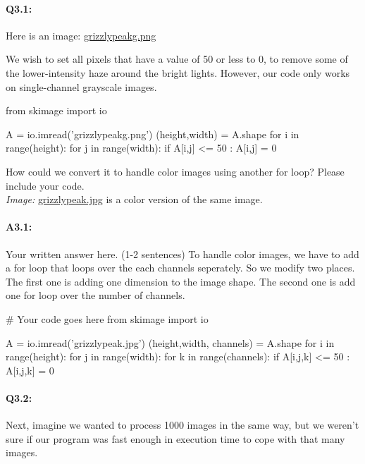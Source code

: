 \documentclass[11pt]{article}
\begin{document}


\pagebreak
\paragraph{Q3.1:} Here is an image: \href{grizzlypeakg.png}{grizzlypeakg.png}

We wish to set all pixels that have a value of 50 or less to 0, to remove some of the lower-intensity haze around the bright lights. However, our code only works on single-channel grayscale images.

\begin{python}
from skimage import io

A = io.imread('grizzlypeakg.png')
(height,width) = A.shape
for i in range(height):
    for j in range(width):
        if A[i,j] <= 50 :
            A[i,j] = 0
\end{python}

How could we convert it to handle color images using another for loop? Please include your code. \\

\emph{Image:} \href{grizzlypeak.jpg}{grizzlypeak.jpg} is a color version of the same image.

\paragraph{A3.1:} Your written answer here. (1-2 sentences)
To handle color images, we have to add a for loop that loops over the each channels seperately. So we modify two places. The first one is adding one dimension to the image shape. The second one is add one for loop over the number of channels.
\begin{python}
# Your code goes here
from skimage import io

A = io.imread('grizzlypeak.jpg')
(height,width, channels) = A.shape
for i in range(height):
    for j in range(width):
        for k in range(channels):
            if A[i,j,k] <= 50 :
                A[i,j,k] = 0
\end{python}



\pagebreak
\paragraph{Q3.2:} Next, imagine we wanted to process 1000 images in the same way, but we weren't sure if our program was fast enough in execution time to cope with that many images. 
\end{document}
